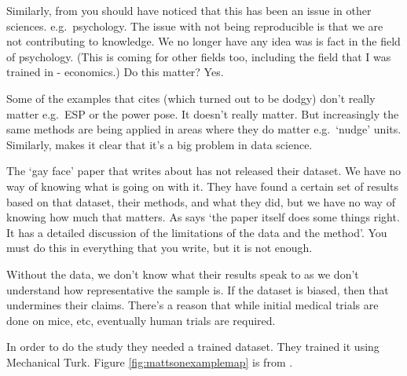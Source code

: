 \documentclass[
]{book}
\begin{document}
Similarly, from \citet{Gelman2016} you should have noticed that this has been an issue in other sciences. e.g.~psychology. The issue with not being reproducible is that we are not contributing to knowledge. We no longer have any idea was is fact in the field of psychology. (This is coming for other fields too, including the field that I was trained in - economics.) Do this matter? Yes.

Some of the examples that \citet{Gelman2016} cites (which turned out to be dodgy) don't really matter e.g.~ESP or the power pose. It doesn't really matter. But increasingly the same methods are being applied in areas where they do matter e.g.~`nudge' units. Similarly, \citet{Simpson2017} makes it clear that it's a big problem in data science.

The `gay face' paper that \citet{Simpson2017} writes about has not released their dataset. We have no way of knowing what is going on with it. They have found a certain set of results based on that dataset, their methods, and what they did, but we have no way of knowing how much that matters. As \citet{Simpson2017} says `the paper itself does some things right. It has a detailed discussion of the limitations of the data and the method'. You must do this in everything that you write, but it is not enough.

Without the data, we don't know what their results speak to as we don't understand how representative the sample is. If the dataset is biased, then that undermines their claims. There's a reason that while initial medical trials are done on mice, etc, eventually human trials are required.

In order to do the study they needed a trained dataset. They trained it using Mechanical Turk. Figure \ref{fig:mattsonexamplemap} is from \citet{Mattson2017}.
\end{document}
